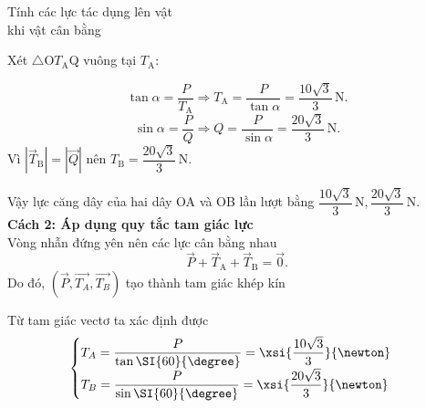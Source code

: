 \begin{dang}{Tính các lực tác dụng lên vật \\khi vật cân bằng}
{		Xét $\triangle$O$T_\text{A}$Q vuông tại $T_\text{A}$:
		
		$$\tan \alpha =\dfrac{P}{T_\text{A}}\Rightarrow T_\text{A}=\dfrac{P}{\tan \alpha}=\dfrac{10\sqrt{3}}{3}\,\text{N}.$$
		$$\sin \alpha =\dfrac{P}{Q}\Rightarrow Q=\dfrac{P}{\sin \alpha}=\dfrac{20\sqrt{3}}{3}\,\text{N}.$$
		Vì $|\vec{T}_\textrm{B}|=|\vec{Q}|$ nên $T_\textrm{B}= \dfrac{20\sqrt{3}}{3}\,\text{N}.$
		
		Vậy lực căng dây của hai dây OA và OB lần lượt bằng $\dfrac{10\sqrt{3}}{3}\,\text{N}, \dfrac{20\sqrt{3}}{3}\,\text{N}.$\\
		\textbf{Cách 2: Áp dụng quy tắc tam giác lực}\\
		Vòng nhẫn đứng yên nên các lực cân bằng nhau
		$$\vec{P}+\vec{T}_\textrm{A}+\vec{T}_\textrm{B}=\vec{0}.$$
		Do đó, $\left(\vec{P}, \overrightarrow{T_A}, \overrightarrow{T_B}\right)$ tạo thành tam giác khép kín
		\begin{center}
		\end{center}
		Từ tam giác vectơ ta xác định được 
		\begin{align*}
			\begin{cases}
				T_A=\dfrac{P}{\tan\SI{60}{\degree}}=\xsi{\dfrac{10\sqrt{3}}{3}}{\newton}\\
				T_B=\dfrac{P}{\sin\SI{60}{\degree}}=\xsi{\dfrac{20\sqrt{3}}{3}}{\newton}
			\end{cases}
		\end{align*}
		
}
\end{dang}
